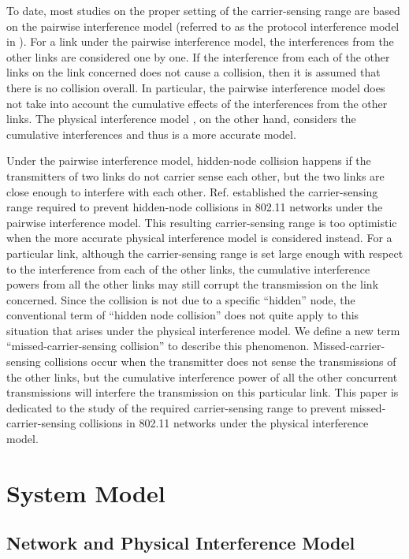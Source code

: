 \documentclass[conference]{IEEEtran}
\begin{document}
To date, most studies on the proper setting of the carrier-sensing
range \cite{KXu,LiBin,PCNg,SXu,Vasan} are based on the pairwise
interference model (referred to as the protocol interference model
in \cite{prgupta}). For a link under the pairwise interference
model, the interferences from the other links are considered one by
one. If the interference from each of the other links on the link
concerned does not cause a collision, then it is assumed that there
is no collision overall. In particular, the pairwise interference
model does not take into account the cumulative effects of the
interferences from the other links. The physical interference model
\cite{prgupta}, on the other hand, considers the cumulative
interferences and thus is a more accurate model.

Under the pairwise interference model, hidden-node collision happens
if the transmitters of two links do not carrier sense each other,
but the two links are close enough to interfere with each other.
Ref. \cite{LiBin} established the carrier-sensing range required to
prevent hidden-node collisions in 802.11 networks under the pairwise
interference model. This resulting carrier-sensing range is too
optimistic when the more accurate physical interference model is
considered instead. For a particular link, although the
carrier-sensing range is set large enough with respect to the
interference from each of the other links, the cumulative
interference powers from all the other links may still corrupt the
transmission on the link concerned. Since the collision is not due
to a specific ``hidden'' node, the conventional term of ``hidden
node collision'' does not quite apply to this situation that arises
under the physical interference model. We define a new term
``missed-carrier-sensing collision'' to describe this phenomenon.
Missed-carrier-sensing collisions occur when the transmitter does
not sense the transmissions of the other links, but the cumulative
interference power of all the other concurrent transmissions will
interfere the transmission on this particular link. This paper is
dedicated to the study of the required carrier-sensing range to
prevent missed-carrier-sensing collisions in 802.11 networks under
the physical interference model.

\section{System Model}\label{system}

\subsection{Network and Physical Interference Model}\label{Model}
\end{document}
